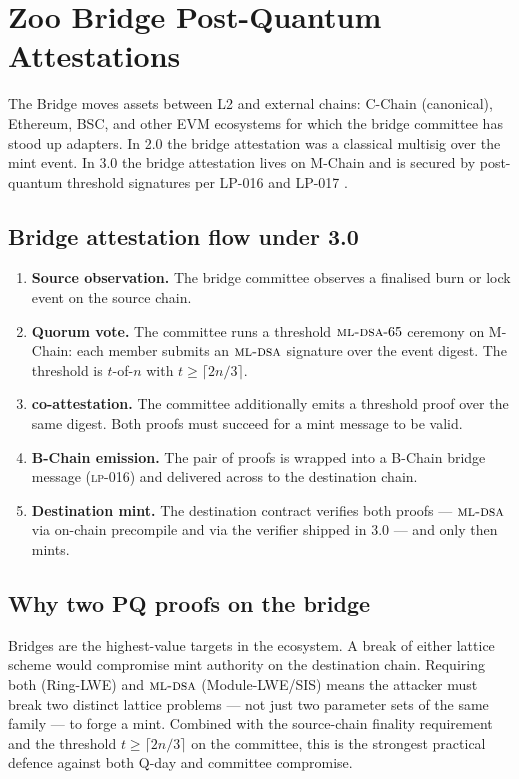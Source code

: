 \section{Zoo Bridge Post-Quantum Attestations}
\label{sec:bridge-pq}

The \Zoo{} Bridge moves assets between \Zoo{} L2 and external
chains: \Lux{} C-Chain (canonical), Ethereum, BSC, and other EVM
ecosystems for which the bridge committee has stood up adapters.
In 2.0 the bridge attestation was a classical multisig over the
mint event. In 3.0 the bridge attestation lives on M-Chain and is
secured by post-quantum threshold signatures per
LP-016 \cite{lp-016} and LP-017 \cite{lp-017}.

\subsection{Bridge attestation flow under 3.0}

\begin{enumerate}[leftmargin=1.4em]
  \item \textbf{Source observation.} The bridge committee observes a
        finalised burn or lock event on the source chain.
  \item \textbf{Quorum vote.} The committee runs a threshold
        $\textsc{ml-dsa}{}\text{-}65$ ceremony on M-Chain: each member submits
        an $\textsc{ml-dsa}{}$ signature over the event digest. The threshold
        is $t$-of-$n$ with $t \geq \lceil 2n/3 \rceil$.
  \item \textbf{\Ringtail{} co-attestation.} The committee additionally
        emits a \Ringtail{} threshold proof over the same digest.
        Both proofs must succeed for a mint message to be valid.
  \item \textbf{B-Chain emission.} The pair of proofs is wrapped into
        a B-Chain bridge message (\textsc{lp-016}) and delivered
        across to the destination chain.
  \item \textbf{Destination mint.} The destination contract verifies
        both proofs --- $\textsc{ml-dsa}{}$ via on-chain precompile and
        \Ringtail{} via the verifier shipped in 3.0 --- and only
        then mints.
\end{enumerate}

\subsection{Why two PQ proofs on the bridge}

Bridges are the highest-value targets in the ecosystem. A break of
either lattice scheme would compromise mint authority on the
destination chain. Requiring both \Ringtail{} (Ring-LWE) and
$\textsc{ml-dsa}{}$ (Module-LWE/SIS) means the attacker must break two
distinct lattice problems --- not just two parameter sets of the
same family --- to forge a mint. Combined with the source-chain
finality requirement and the threshold $t \geq \lceil 2n/3 \rceil$
on the committee, this is the strongest practical defence against
both Q-day and committee compromise.

